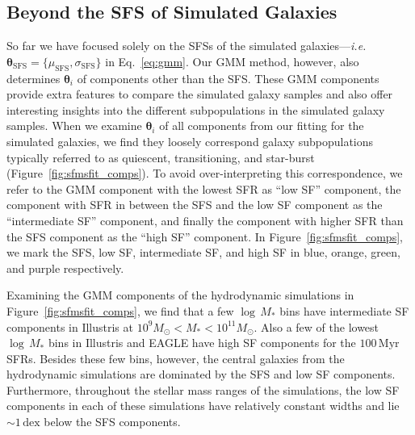 \documentclass[tighten, preprint]{aastex62}
\begin{document}
\subsection{Beyond the SFS of Simulated Galaxies} \label{sec:beyondsfms}
So far we have focused solely on the SFSs of the simulated 
galaxies---\emph{i.e.} 
$\bm{\theta}_\mathrm{SFS} = \{\mu_\mathrm{SFS}, \sigma_\mathrm{SFS} \}$ 
in Eq.~\ref{eq:gmm}. Our GMM method, however, also determines 
$\bm{\theta}_i$ of components other than the SFS. These GMM components 
provide extra features to compare the simulated galaxy samples and also 
offer interesting insights into the different subpopulations in the simulated 
galaxy samples. When we examine $\bm{\theta}_i$ of all components from 
our fitting for the simulated galaxies, 
{\color{red}
we find they loosely correspond galaxy subpopulations typically referred to as 
quiescent, transitioning, and star-burst}
(Figure~\ref{fig:sfmsfit_comps}). To avoid over-interpreting 
this correspondence, we refer to the GMM component with the lowest SFR as 
``low SF'' component, the component with SFR in between the SFS and the 
low SF component as the ``intermediate SF'' component, and finally the 
component with higher SFR than the SFS component as the ``high SF'' component. 
In Figure~\ref{fig:sfmsfit_comps}, we mark the SFS, low SF, intermediate SF, 
and high SF in blue, orange, green, and purple respectively.

Examining the GMM components of the hydrodynamic simulations in 
Figure~\ref{fig:sfmsfit_comps}, we find that a few $\log\,M_*$ bins have 
intermediate SF components in Illustris at $10^9 M_\odot < M_* < 10^{11}M_\odot$.
Also a few of the lowest $\log\,M_*$ bins in Illustris and EAGLE have high SF
components for the $100\,\mathrm{Myr}$ SFRs. Besides these few 
bins, however, the central galaxies from the hydrodynamic simulations are
dominated by the SFS and low SF components. Furthermore, 
throughout the stellar mass ranges of the simulations, the low SF 
components in each of these simulations have relatively constant widths and 
lie ${\sim}1\,\mathrm{dex}$ below the SFS components.
\end{document}
